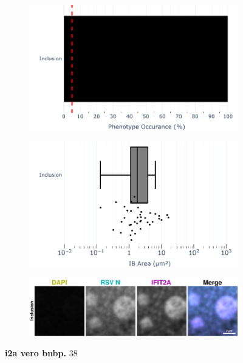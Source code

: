 \begin{figure}
    \begin{subfigure}{0.495\textwidth}
        \caption{}
        \includegraphics[width=1\linewidth]{10. Chapter 5/Figs/02. pIB/02. IFIT2A/07. bar_i2a_vero_bnbp.pdf} 
    \end{subfigure}
    \begin{subfigure}{0.495\textwidth}
        \caption{}
        \includegraphics[width=1\linewidth]{10. Chapter 5/Figs/02. pIB/02. IFIT2A/08. box_i2a_vero_bnbp.pdf}
    \end{subfigure}
    \begin{subfigure}{1\textwidth}
        \caption{}
        \includegraphics[width=1\linewidth]{10. Chapter 5/Figs/02. pIB/02. IFIT2A/09. i2a-vero-bnbp.pdf} 
    \end{subfigure}
    \caption[i2a vero bnbp]{\textbf{i2a vero bnbp.} 38}
    \label{fig:i2a vero bnbp}
\end{figure}

